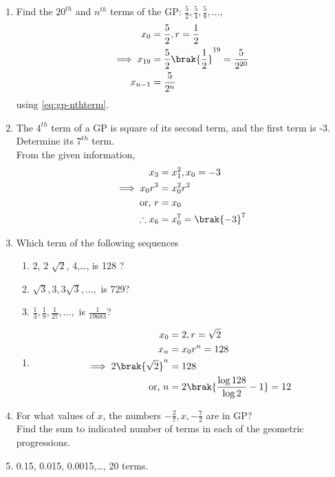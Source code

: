 \begin{enumerate}[label=\thesubsection.\arabic*.,ref=\thesubsection.\theenumi]
\item Find the $20^{th}$ and $n^{th}$ terms of the GP: $\frac{5}{2}, \frac{5}{4}, \frac{5}{8},\dots, $
	\\
	\solution
\begin{align}
	x_0 &= \frac{5}{2}, r = \frac{1}{2}
	\\
	\implies x_{19} &=\frac{5}{2}\brak{\frac{1}{2}}^{19}=\frac{5}{2^{20}}
	\\
	x_{n-1} &= \frac{5}{2^n}
\end{align}
using
	\eqref{eq:gp-nthterm}.
\item The $4^{th}$ term of a GP  is square of its second term, and the first term is -3. Determine its $7^{th}$ term.
	\\
	\solution  From the given information, 
\begin{align}
	x_3 &= x_1^2, x_0 = -3
	\\
	\implies x_0r^3&= x_0^2r^2
	\\
	\text{or, } r &= x_0
	\\
	\therefore x_6 &= x_0^7= \brak{-3}^7
\end{align}
\item Which term of the following sequences
\begin{enumerate}
	\item 2, 2 $\sqrt{2}$, 4,\dots,  is 128 ?
	\item $\sqrt{3}, 3, 3\sqrt{3},\dots,$  is 729?
	\item $\frac{1}{3}, \frac{1}{9}, \frac{1}{27}, \dots,$  is $\frac{1}{19683}$?
\end{enumerate}
	\solution
\begin{enumerate}
	\item 
\begin{align}
	x_0&= 2, r = \sqrt{2}
	\\
	x_n &= x_0r^n = 128
	\\
		\implies 2\brak{\sqrt{2}}^n &= 128
		\\
		\text{or, } n &= 2\brak{\frac{\log 128}{\log 2}-1}=12
\end{align}
\end{enumerate}
\item For what values of $x$, the numbers $-\frac{2}{7}, x, -\frac{7}{2}$ are in GP?
\\
	Find the sum to indicated number of terms in each of the geometric progressions.
\item 0.15, 0.015, 0.0015,\dots,  20 terms.

\end{enumerate}

